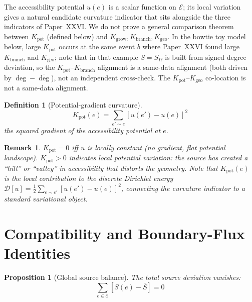 \documentclass[12pt]{article}
\newtheorem{proposition}[theorem]{Proposition}
\newtheorem{definition}[theorem]{Definition}
\newtheorem{remark}[theorem]{Remark}
\newcommand{\Ecal}{\mathcal{E}}
\begin{document}
The accessibility potential $u(e)$ is a scalar function on $\Ecal$; its local variation gives a natural candidate curvature indicator that sits alongside the three indicators of Paper~XXVI. We do not prove a general comparison theorem between $K_{\mathrm{pot}}$ (defined below) and $K_{\mathrm{grow}}, K_{\mathrm{branch}}, K_{\mathrm{geo}}$. In the bowtie toy model below, large $K_{\mathrm{pot}}$ occurs at the same event $b$ where Paper~XXVI found large $K_{\mathrm{branch}}$ and $K_{\mathrm{geo}}$; note that in that example $S = S_\Omega$ is built from signed degree deviation, so the $K_{\mathrm{pot}}$--$K_{\mathrm{branch}}$ alignment is a same-data alignment (both driven by $\deg - \overline{\deg}$), not an independent cross-check. The $K_{\mathrm{pot}}$--$K_{\mathrm{geo}}$ co-location is not a same-data alignment.

\begin{definition}[Potential-gradient curvature]\label{def:Kpot}
\begin{equation}
    K_{\mathrm{pot}}(e) = \sum_{e' \sim e} [u(e') - u(e)]^2
\end{equation}
the squared gradient of the accessibility potential at $e$.
\end{definition}

\begin{remark}
$K_{\mathrm{pot}} = 0$ iff $u$ is locally constant (no gradient, flat potential landscape). $K_{\mathrm{pot}} > 0$ indicates local potential variation: the source has created a ``hill'' or ``valley'' in accessibility that distorts the geometry. Note that $K_{\mathrm{pot}}(e)$ is the local contribution to the discrete Dirichlet energy $\mathcal{D}[u] = \tfrac{1}{2}\sum_{e \sim e'}[u(e')-u(e)]^2$, connecting the curvature indicator to a standard variational object.
\end{remark}

\section{Compatibility and Boundary-Flux Identities}\label{sec:conservation}

\begin{proposition}[Global source balance]\label{prop:balance}
The total source deviation vanishes:
\begin{equation}
    \sum_{e \in \Ecal} [S(e) - \bar{S}] = 0
\end{equation}
\end{proposition}
\end{document}
